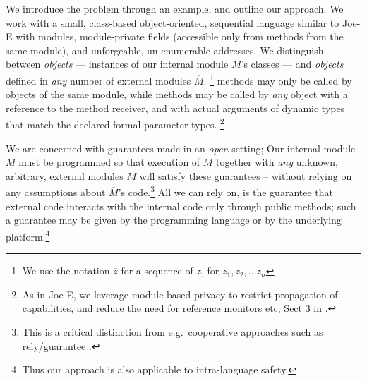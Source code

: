  \newcommand{\pwd}{key}

\renewcommand{\password}{key\xspace}

We introduce the problem  through an example, and outline our
approach.  We work with a  small, class-based object-oriented, sequential language similar to Joe-E \cite{JoeE} with modules,   module-private fields
({accessible} only from   methods {from} the same module),
and unforgeable, un-enumerable addresses.
We distinguish between  \emph{\internalO  objects} --- instances of our internal module $M$'s classes ---
and \emph{\externalO  objects} defined in
\emph{any} number of external modules $\overline M$.%
\!\footnote{We use the notation $\overline z$ for a sequence of $z$, \ie for $z_1,z_2,...z_n$ }
{ methods  {may only be} called by objects of the same
  module,  while   methods  may be {called} by \emph{any}
  object with a reference to the method receiver, {and with
  actual arguments of  dynamic types that match} the declared formal parameter types.}%
\!\footnote{As in Joe-E, we leverage  module-based privacy to restrict propagation of capabilities, and reduce the need for reference monitors etc, \cf Sect 3 in  \cite{JoeE}.}   

\label{s:concepts}
 
We are concerned with guarantees made in an \emph{open} setting; %
Our internal module
$M$ must be programmed so that 
  execution of $M$  together with \emph{any} unknown, arbitrary, external modules $\overline M$
will satisfy these guarantees --
without relying on any assumptions about $\overline M$'s code.\footnote{This is a critical distinction from e.g.\
cooperative approaches such as rely/guarantee
\cite{relyGuarantee-HayesJones-setss2017,relyGuarantee-vanStaden-mpc2015}.}
All we can rely on, is the guarantee that external code interacts with the internal code only through public methods; such a guarantee may be given by the programming language or by the underlying platform.\footnote{Thus our approach is also applicable to intra-language safety.}
  
